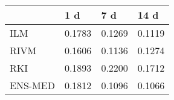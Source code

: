\begin{tabular}{llll}
\toprule
 & 1 d & 7 d & 14 d \\
\midrule
ILM & 0.1783 & 0.1269 & 0.1119 \\
RIVM & 0.1606 & 0.1136 & 0.1274 \\
RKI & 0.1893 & 0.2200 & 0.1712 \\
ENS-MED & 0.1812 & 0.1096 & 0.1066 \\
\bottomrule
\end{tabular}
